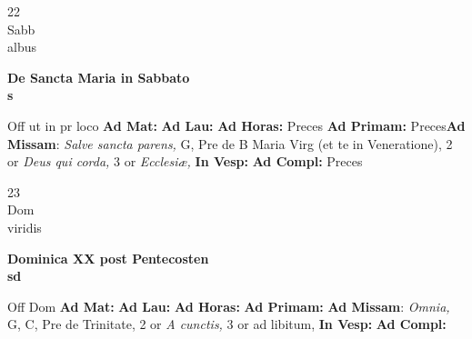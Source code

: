 \documentclass[10pt, openany]{book}
\begin{document}
    \begin{center}
        \begin{minipage}{3.5in}
            \vspace{2em}
            \begin{minipage}{0.5in}
                {\Huge 22} \\
                {\normalsize Sabb} \\
                {\normalsize albus}
            \end{minipage}
            \begin{minipage}{3.0in}
                \textbf{ \large De Sancta Maria in Sabbato \\
                \textnormal{\normalsize s}} \\ 
            \end{minipage}
            \begin{justify}Off ut in pr loco
                \textbf{Ad Mat: }
                \textbf{Ad Lau: }
                \textbf{Ad Horas: }Preces
                \textbf{Ad Primam: }Preces\textbf{Ad Missam}: \textit{Salve sancta parens,} G, Pre de B Maria Virg (et te in Veneratione), 2 or \textit{Deus qui corda,} 3 or \textit{Ecclesiæ,}  
                \textbf{In Vesp: }
                \textbf{Ad Compl: }Preces
            \end{justify}
        \end{minipage}
    \end{center}

    \begin{center}
        \begin{minipage}{3.5in}
            \vspace{2em}
            \begin{minipage}{0.5in}
                {\Huge 23} \\
                {\normalsize Dom} \\
                {\normalsize viridis}
            \end{minipage}
            \begin{minipage}{3.0in}
                \textbf{ \large Dominica XX post Pentecosten \\
                \textnormal{\normalsize sd}} \\ 
            \end{minipage}
            \begin{justify}Off Dom
                \textbf{Ad Mat: }
                \textbf{Ad Lau: }
                \textbf{Ad Horas: }
                \textbf{Ad Primam: }\textbf{Ad Missam}: \textit{Omnia,} G, C, Pre de Trinitate, 2 or \textit{A cunctis,} 3 or ad libitum,  
                \textbf{In Vesp: }
                \textbf{Ad Compl: }
            \end{justify}
        \end{minipage}
    \end{center}
\end{document}
